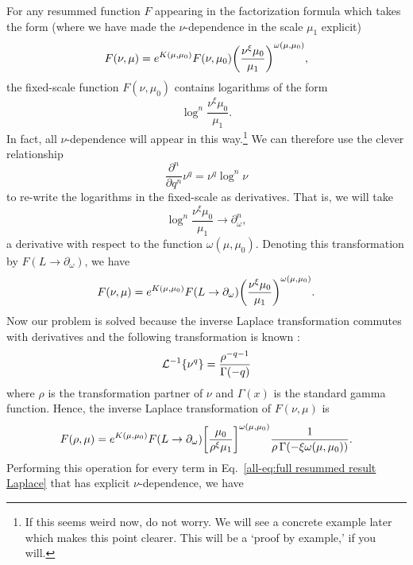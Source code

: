 \documentclass[../thesis.tex]{subfiles}
\providecommand{\cL}{\mathcal{L}}
\begin{document}
	For any resummed function $F$ appearing in the factorization formula which takes the form (where we have made the $\nu$-dependence in the scale $\mu_1$ explicit)
	\begin{equation}
		F(\nu, \mu) = e^{K(\mu, \mu_0)} F(\nu, \mu_0) \qty(\frac{\nu^\xi \mu_0}{\mu_1})^{\omega(\mu, \mu_0)},
	\end{equation}
	the fixed-scale function $F(\nu, \mu_0)$ contains logarithms of the form \cite{frye_factorization_2016}
	\begin{equation}
		\log^n \frac{\nu^\xi \mu_0}{\mu_1}.
	\end{equation}
	In fact, all $\nu$-dependence will appear in this way.\footnote{If this seems weird now, do not worry. We will see a concrete example later which makes this point clearer. This will be a `proof by example,' if you will.} We can therefore use the clever relationship \cite{becher_factorization_2007,frye_factorization_2016}
	\begin{equation}
		\frac{\partial^n}{\partial q^n} \nu^q = \nu^q \log^n \nu
	\end{equation}
	to re-write the logarithms in the fixed-scale as derivatives. That is, we will take
	\begin{equation}
		\log^n \frac{\nu^\xi \mu_0}{\mu_1} \to \partial^n_{\omega},
	\end{equation}
	a derivative with respect to the function $\omega(\mu, \mu_0)$. Denoting this transformation by $F(L \to \partial_\omega)$, we have
	\begin{equation}
		F(\nu, \mu) = e^{K(\mu, \mu_0)} F(L \to \partial_\omega) \qty(\frac{\nu^\xi \mu_0}{\mu_1})^{\omega(\mu, \mu_0)}.
	\end{equation}
	Now our problem is solved because the inverse Laplace transformation commutes with derivatives and the following transformation is known \cite{frye_factorization_2016}:
	\begin{equation}
		\cL^{-1}\qty{\nu^q} = \frac{\rho^{-q - 1}}{\Gamma(-q)}
	\end{equation}
	where $\rho$ is the transformation partner of $\nu$ and $\Gamma(x)$ is the standard gamma function. Hence, the inverse Laplace transformation of $F(\nu, \mu)$ is
	\begin{equation}\label{all-eq:resummed inverse Laplace transform}
		F(\rho, \mu) = e^{K(\mu, \mu_0)} F(L \to \partial_\omega)\qty[\frac{\mu_0}{\rho^\xi\mu_1}]^{\omega(\mu, \mu_0)} \frac{1}{\rho\,\Gamma(-\xi \omega(\mu, \mu_0))}.
	\end{equation}
	Performing this operation for every term in Eq.~\ref{all-eq:full resummed result Laplace} that has explicit $\nu$-dependence, we have
\end{document}
